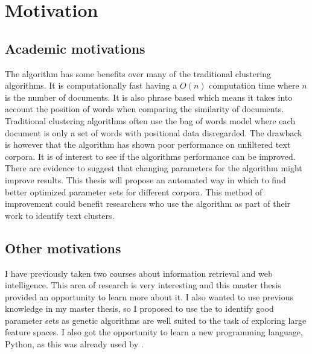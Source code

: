 
\section{Motivation}
\subsection{Academic motivations}

The \STC algorithm has some benefits over many of the traditional clustering algorithms. It is computationally fast having a \(O(n)\) computation time where \(n\) is the number of documents. It is also phrase based which means it takes into account the position of words when comparing the similarity of documents. Traditional clustering algorithms often use the bag of words model where each document is only a set of words with positional data disregarded. The drawback is however that the \STC algorithm has shown poor performance on unfiltered text corpora. It is of interest to see if the algorithms performance can be improved. There are evidence to suggest that changing parameters for the algorithm might improve results. This thesis will propose an automated way in which to find better optimized parameter sets for different corpora. This method of improvement could benefit researchers who use the algorithm as part of their work to identify text clusters.

\subsection{Other motivations}
I have previously taken two courses about information retrieval and web intelligence. This area of research is very interesting and this master thesis provided an opportunity to learn more about it. I also wanted to use previous knowledge in my master thesis, so I proposed to use the \GA to identify good parameter sets as genetic algorithms are well suited to the task of exploring large feature spaces. I also got the opportunity to learn a new programming language, Python, as this was already used by \supervisor.


